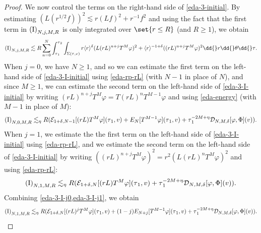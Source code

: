 \documentclass[10pt, reqno]{amsart}
\begin{document}
\begin{proof}
We now control the terms on the right-hand side of \cref{eda-3-initial}. By estimating
\((L(r^{1/2}f))^2 \lesssim r(Lf)^2 + r^{-1}f^2\) and using the fact that the
first term in \(\textnormal{(I)}_{N,j,M,R}\) is only integrated over \(\set{r\le
R}\) (and \(R\ge 1\)), we obtain
\begin{equation}\label{eda-3-I-initial}
\begin{split}
\textnormal{(I)}_{N,j,M,R}\lesssim R\sum_{n=0}^N\int_{\tau{}_1}^{\tau{}_2}\int _{\Sigma{}(\tau{},v)} r\langle{}r\rangle^\delta{}(L(rL)^{n+j}T^M\varphi{})^2 + \langle{}r\rangle^{-1+\delta{}}((rL)^{n+j}T^{M}\varphi{})^2\dd{}r\dd{}\theta{}\dd{}\tau{}.
\end{split}
\end{equation}
When \(j = 0\), we have \(N\ge 1\), and so we can estimate the first term on the
left-hand side of \cref{eda-3-I-initial} using \cref{eda-rp-rL} (with \(N-1\) in place of \(N\)),
and since \(M\ge 1\), we can estimate the second term on the left-hand side of
\cref{eda-3-I-initial} by writing \((rL)^{n +j }T^M\varphi{} = T(rL)^{n}T^{M-1}\varphi{}\)
and using \cref{eda-energy} (with \(M-1\) in place of \(M\)):
\begin{equation}\label{eda-3-I-j0}
\begin{split}
\textnormal{(I)}_{N,0,M,R} &\lesssim_\eta{} R(\mathcal{E}_{1+\delta{},N-1}[(rL)T^M\varphi{}](\tau{}_1,v) + E_{N}[T^{M-1}\varphi{}](\tau{}_1,v) + \tau{}_1^{-2M+\eta{}}\mathcal{D}_{N,M,\delta{}}[\varphi{},\Phi{}](v)). \\
\end{split}
\end{equation}
When \(j = 1\), we estimate the the first term on the left-hand side of \cref{eda-3-I-initial}
using \cref{eda-rp-rL}, and we estimate the second term on the left-hand side of
\cref{eda-3-I-initial} by writing \(((rL)^{n +j}T^M\varphi{})^2 =
r^2(L(rL)^{n}T^{M}\varphi{})^2\) and using \cref{eda-rp-rL}:
\begin{equation}\label{eda-3-I-j1}
\textnormal{(I)}_{N,1,M,R}\lesssim_\eta{} R(\mathcal{E}_{1+\delta{},N}[(rL)T^M\varphi{}](\tau{}_1,v) + \tau{}_1^{-2M+\eta{}}\mathcal{D}_{N,M,\delta{}}[\varphi{},\Phi{}](v)).
\end{equation}
Combining \cref{eda-3-I-j0,eda-3-I-j1}, we obtain
\begin{equation}\label{eda-3-I}
\textnormal{(I)}_{N,1,M,R}\lesssim_\eta{}  R(\mathcal{E}_{1+\delta{},N}[(rL)^jT^M\varphi{}](\tau{}_1,v) + (1-j)E_{N+j}[T^{M-1}\varphi{}](\tau{}_1,v) + \tau{}_1^{-2M+\eta{}}\mathcal{D}_{N,M,\delta{}}[\varphi{},\Phi{}](v)).
\end{equation}


\end{proof}
\end{document}
